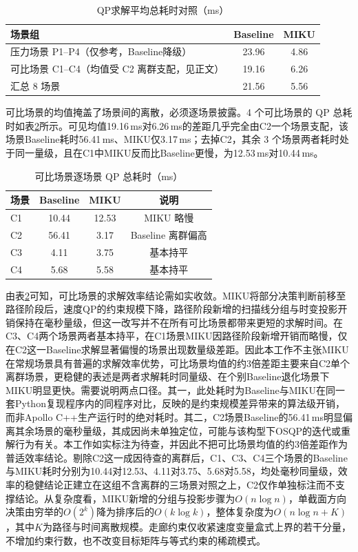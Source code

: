 \documentclass[a4paper,11pt]{ctexart}
\theoremstyle{definition}
\begin{document}
\begin{table}[htbp]
\centering
\caption{QP求解平均总耗时对照（ms）}
\label{tab:exp_qp}
\small
\begin{tabular}{lcc}
\toprule
\textbf{场景组} & \textbf{Baseline} & \textbf{MIKU} \\
\midrule
压力场景 P1--P4（仅参考，Baseline降级） & 23.96 & 4.86 \\
可比场景 C1--C4（均值受 C2 离群支配，见正文） & 19.16 & 6.26 \\
\midrule
汇总 8 场景 & 21.56 & 5.56 \\
\bottomrule
\end{tabular}
\end{table}

可比场景的均值掩盖了场景间的离散，必须逐场景披露。4 个可比场景的 QP 总耗时如表\ref{tab:exp_qp_percomp}所示。可见均值19.16\,ms对6.26\,ms的差距几乎完全由C2一个场景支配，该场景Baseline耗时56.41\,ms、MIKU仅3.17\,ms；去掉C2，其余 3 个场景两者耗时处于同一量级，且在C1中MIKU反而比Baseline更慢，为12.53\,ms对10.44\,ms。

\begin{table}[htbp]
\centering
\caption{可比场景逐场景 QP 总耗时（ms）}
\label{tab:exp_qp_percomp}
\small
\begin{tabular}{lccc}
\toprule
\textbf{场景} & \textbf{Baseline} & \textbf{MIKU} & \textbf{说明} \\
\midrule
C1 & 10.44 & 12.53 & MIKU 略慢 \\
C2 & 56.41 & 3.17 & Baseline 离群偏高 \\
C3 & 4.11 & 3.75 & 基本持平 \\
C4 & 5.68 & 5.58 & 基本持平 \\
\bottomrule
\end{tabular}
\end{table}

由表\ref{tab:exp_qp_percomp}可知，可比场景的求解效率结论需如实收敛。MIKU将部分决策判断前移至路径阶段后，速度QP的约束规模下降，路径阶段新增的扫描线分组与时变投影开销保持在毫秒量级，但这一改写并不在所有可比场景都带来更短的求解时间。在C3、C4两个场景两者基本持平，在C1场景MIKU因路径阶段新增开销而略慢，仅在C2这一Baseline求解显著偏慢的场景出现数量级差距。因此本工作不主张MIKU在常规场景具有普遍的求解效率优势，可比场景均值的约3倍差距主要来自C2单个离群场景，更稳健的表述是两者求解耗时同量级、在个别Baseline退化场景下MIKU明显更快。需要说明两点口径。其一，此处耗时为Baseline与MIKU在同一套Python复现程序内的同程序对比，反映的是约束规模差异带来的算法级开销，而非Apollo C++生产运行时的绝对耗时。其二，C2场景Baseline的56.41\,ms明显偏离其余场景的毫秒量级，其成因尚未单独定位，可能与该构型下OSQP的迭代或重解行为有关。本工作如实标注为待查，并因此不把可比场景均值的约3倍差距作为普适效率结论。剔除C2这一成因待查的离群后，C1、C3、C4三个场景的Baseline与MIKU耗时分别为10.44对12.53、4.11对3.75、5.68对5.58，均处毫秒同量级，效率的稳健结论正建立在这组不含离群的三场景对照之上，C2仅作单独标注而不支撑结论。从复杂度看，MIKU新增的分组与投影步骤为$O(n \log n)$，单截面方向决策由穷举的$O(2^k)$降为排序后的$O(k \log k)$，整体复杂度为$O(n \log n + K)$，其中$K$为路径与时间离散规模。走廊约束仅收紧速度变量盒式上界的若干分量，不增加约束行数，也不改变目标矩阵与等式约束的稀疏模式。
\end{document}

